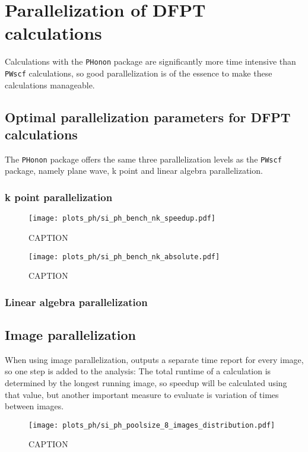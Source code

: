 \documentclass[main.tex]{subfiles}
\begin{document}
\chapter{Parallelization of DFPT calculations}

Calculations with the \texttt{PHonon} package are significantly more time intensive than \texttt{PWscf} calculations, so good parallelization is of the essence to make these calculations manageable.

\section{Optimal parallelization parameters for DFPT calculations}
The \texttt{PHonon} package offers the same three parallelization levels as the \texttt{PWscf} package, namely plane wave, k point and linear algebra parallelization.

\subsection{k point parallelization}



\begin{figure}[ht!]
    \centering
    \texttt{[image: plots\_ph/si\_ph\_bench\_nk\_speedup.pdf]}
    \caption{CAPTION}
    \label{fig:scaling_ph_nk_si}
\end{figure}

\begin{figure}[ht!]
    \centering
    \texttt{[image: plots\_ph/si\_ph\_bench\_nk\_absolute.pdf]}
    \caption{CAPTION}
    \label{fig:scaling_ph_nk_si_absolute}
\end{figure}

\subsection{Linear algebra parallelization}

\section{Image parallelization}

When using image parallelization, \QE outputs a separate time report for every image, so one step is added to the analysis:
The total runtime of a calculation is determined by the longest running image, so speedup will be calculated using that value, but another important measure to evaluate is variation of times between images.
\begin{figure}[ht!]
    \centering
    \texttt{[image: plots\_ph/si\_ph\_poolsize\_8\_images\_distribution.pdf]}
    \caption{CAPTION}
    \label{fig:scaling_ph_ni_poolsize_8_si_distribution}
\end{figure}
\end{document}
